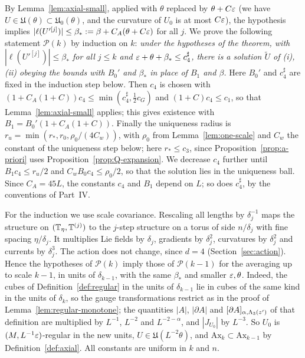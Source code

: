By Lemma~\ref{lem:axial-small}, applied with $\theta$ replaced by $\theta+C\varepsilon$ (we have $U\in\mathfrak U(\theta)\subset\mathfrak U_0(\theta)$, and the curvature of $U_0$ is at most $C\varepsilon$), the hypothesis implies $|\ell(U'^{[j]})|\le\beta_*:=\beta+C_A(\theta+C\varepsilon)$ for all $j$. We prove the following statement $\mathcal P(k)$ by induction on $k$: \emph{under the hypotheses of the theorem, with $|\ell(U'^{[j]})|\le\beta_*$ for all $j\le k$ and $\varepsilon+\theta+\beta_*\le c_4^\sharp$, there is a solution $\tilde U$ of (i), (ii) obeying the bounds with $B_0'$ and $\beta_*$ in place of $B_1$ and $\beta$.} Here $B_0'$ and $c_4^\sharp$ are fixed in the induction step below. Then $c_4$ is chosen with $(1+C_A(1+C))c_4\le\min(c_4^\sharp,\frac12c_G)$ and $(1+C)c_4\le c_1$, so that Lemma~\ref{lem:axial-small} applies; this gives existence with $B_1=B_0'(1+C_A(1+C))$. Finally the uniqueness radius is $r_u=\min(r_*,r_0,\rho_0/(4C_w))$, with $\rho_0$ from Lemma~\ref{lem:one-scale} and $C_w$ the constant of the uniqueness step below; here $r_*\le c_3$, since Proposition~\ref{prop:a-priori} uses Proposition~\ref{prop:Q-expansion}. We decrease $c_4$ further until $B_1c_4\le r_u/2$ and $C_wB_0c_4\le\rho_0/2$, so that the solution lies in the uniqueness ball. Since $C_A=45L$, the constants $c_4$ and $B_1$ depend on $L$; so does $c_4^\sharp$, by the conventions of Part~IV.

For the induction we use scale covariance. Rescaling all lengths by $\delta_j^{-1}$ maps the structure on $(\mathbb T_\eta,\mathbb T^{(j)})$ to the $j$-step structure on a torus of side $n/\delta_j$ with fine spacing $\eta/\delta_j$. It multiplies Lie fields by $\delta_j$, gradients by $\delta_j^2$, curvatures by $\delta_j^2$ and currents by $\delta_j^3$. The action does not change, since $d=4$ (Section~\ref{sec:action}). Hence the hypotheses of $\mathcal P(k)$ imply those of $\mathcal P(k-1)$ for the averaging up to scale $k-1$, in units of $\delta_{k-1}$, with the same $\beta_*$ and smaller $\varepsilon,\theta$. Indeed, the cubes of Definition~\ref{def:regular} in the units of $\delta_{k-1}$ lie in cubes of the same kind in the units of $\delta_k$, so the gauge transformations restrict as in the proof of Lemma~\ref{lem:regular-monotone}; the quantities $|A|$, $|\partial A|$ and $[\partial A]_{\alpha,\Lambda_3(z')}$ of that definition are multiplied by $L^{-1}$, $L^{-2}$ and $L^{-2-\alpha}$, and $|J_{U_0}|$ by $L^{-3}$. So $U_0$ is $(M,L^{-1}\varepsilon)$-regular in the new units, $U\in\mathfrak U(L^{-2}\theta)$, and $\mathrm{Ax}_k\subset\mathrm{Ax}_{k-1}$ by Definition~\ref{def:axial}. All constants are uniform in $k$ and $n$.


